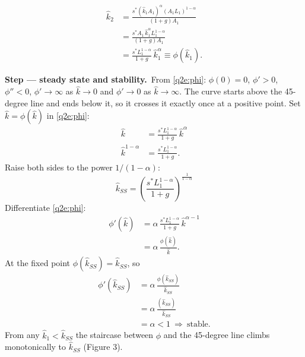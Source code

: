 \documentclass[11pt,a4paper]{article}
\newcommand{\passo}[2]{\par\smallskip\noindent\textbf{Step --- #1.}~#2}
\begin{document}
\begin{sol}
\begin{align}
\hat k_2 &= \frac{s^\ast(\hat k_1A_1)^{\alpha}(A_1L_1)^{1-\alpha}}{(1+g)A_1}\nonumber\\
&= \frac{s^\ast A_1\,\hat k_1^{\alpha}L_1^{1-\alpha}}{(1+g)A_1}\nonumber\\
&= \boxed{\frac{s^\ast L_1^{1-\alpha}}{1+g}\,\hat k_1^{\alpha}}\equiv\phi(\hat k_1). \label{q2e:phi}
\end{align}
\passo{steady state and stability}{From \eqref{q2e:phi}: $\phi(0)=0$, $\phi'>0$, $\phi''<0$,
$\phi'\to\infty$ as $\hat k\to0$ and $\phi'\to0$ as $\hat k\to\infty$. The curve starts above the
45-degree line and ends below it, so it crosses it exactly once at a positive point. Set
$\hat k=\phi(\hat k)$ in \eqref{q2e:phi}:}
\begin{align*}
\hat k &= \frac{s^\ast L_1^{1-\alpha}}{1+g}\,\hat k^{\alpha}\\
\hat k^{1-\alpha} &= \frac{s^\ast L_1^{1-\alpha}}{1+g}.
\end{align*}
Raise both sides to the power $1/(1-\alpha)$:
\begin{equation}
\boxed{\hat k_{SS}=\left(\frac{s^\ast L_1^{1-\alpha}}{1+g}\right)^{\frac{1}{1-\alpha}}} \label{q2e:kss}
\end{equation}
Differentiate \eqref{q2e:phi}:
\begin{align*}
\phi'(\hat k) &= \alpha\,\frac{s^\ast L_1^{1-\alpha}}{1+g}\,\hat k^{\alpha-1}\\
&= \alpha\,\frac{\phi(\hat k)}{\hat k}.
\end{align*}
At the fixed point $\phi(\hat k_{SS})=\hat k_{SS}$, so
\begin{align*}
\phi'(\hat k_{SS}) &= \alpha\,\frac{\phi(\hat k_{SS})}{\hat k_{SS}}\\
&= \alpha\,\frac{(\hat k_{SS})}{\hat k_{SS}}\\
&= \alpha<1\ \Rightarrow\ \text{stable}.
\end{align*}
From any $\hat k_1<\hat k_{SS}$ the staircase between $\phi$ and the 45-degree line climbs
monotonically to $\hat k_{SS}$ (Figure 3).
\begin{center}
\end{center}
\end{sol}
\end{document}
